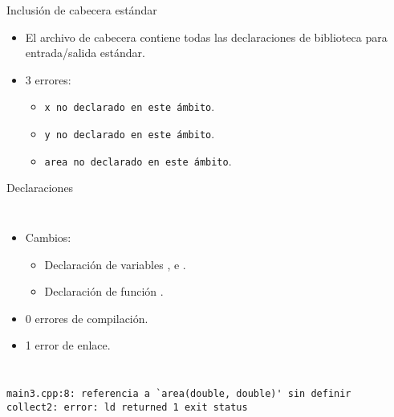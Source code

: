 \begin{frame}[t,fragile]{Inclusión de cabecera estándar}

\begin{itemize}
  \item El archivo de cabecera  contiene todas las declaraciones
        de biblioteca para entrada/salida estándar.

  \item 3 errores:
    \begin{itemize}
      \item \texttt{x no declarado en este ámbito}.
      \item \texttt{y no declarado en este ámbito}.
      \item \texttt{area no declarado en este ámbito}.
    \end{itemize}
\end{itemize}
\end{frame}

\begin{frame}[t,fragile]{Declaraciones}

\begin{columns}[T]





\begin{itemize}
  \item Cambios:
    \begin{itemize}
      \item Declaración de variables , e .
      \item Declaración de función .
    \end{itemize}
  \item 0 errores de compilación.
  \item 1 error de enlace.
\end{itemize}

\end{columns}

\begin{lstlisting}[style=terminal]
main3.cpp:8: referencia a `area(double, double)' sin definir
collect2: error: ld returned 1 exit status
\end{lstlisting}
\end{frame}
